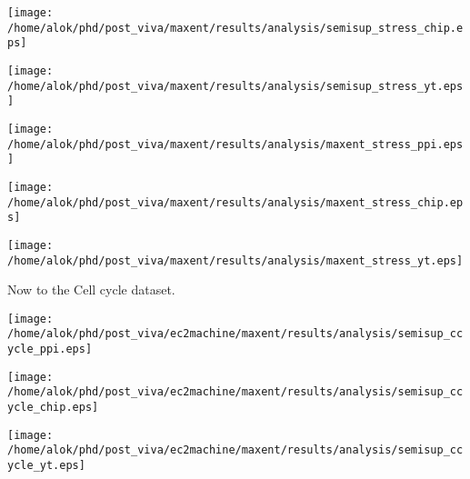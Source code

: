 \begin{center}
 \texttt{[image: /home/alok/phd/post\_viva/maxent/results/analysis/semisup\_stress\_chip.eps]}
\end{center}
\begin{center}
 \texttt{[image: /home/alok/phd/post\_viva/maxent/results/analysis/semisup\_stress\_yt.eps]}
\end{center}

\begin{center}
 \texttt{[image: /home/alok/phd/post\_viva/maxent/results/analysis/maxent\_stress\_ppi.eps]}
\end{center}

\begin{center}
 \texttt{[image: /home/alok/phd/post\_viva/maxent/results/analysis/maxent\_stress\_chip.eps]}
\end{center}
\begin{center}
 \texttt{[image: /home/alok/phd/post\_viva/maxent/results/analysis/maxent\_stress\_yt.eps]}
\end{center}

Now to the Cell cycle dataset.
\begin{center}
 \texttt{[image: /home/alok/phd/post\_viva/ec2machine/maxent/results/analysis/semisup\_ccycle\_ppi.eps]}
\end{center}

\begin{center}
 \texttt{[image: /home/alok/phd/post\_viva/ec2machine/maxent/results/analysis/semisup\_ccycle\_chip.eps]}
\end{center}
\begin{center}
 \texttt{[image: /home/alok/phd/post\_viva/ec2machine/maxent/results/analysis/semisup\_ccycle\_yt.eps]}
\end{center}

